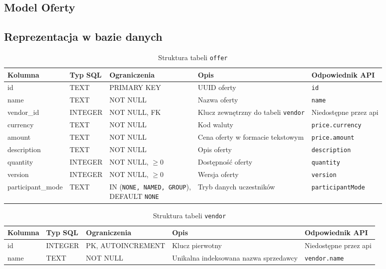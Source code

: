 \documentclass[11pt]{article}
\begin{document}
\subsection{Model Oferty}



\subsection{Reprezentacja w bazie danych}

\begin{table}[H]
  \centering
  \renewcommand{\arraystretch}{1.3} %
  \begin{tabularx}{\textwidth}{|l|l|l|X|l|}
    \hline
    \textbf{Kolumna} & \textbf{Typ SQL} & \textbf{Ograniczenia} & \textbf{Opis} & \textbf{Odpowiednik API} \\
    \hline
    id & TEXT & PRIMARY KEY & UUID oferty & \texttt{id} \\
    \hline
    name & TEXT & NOT NULL & Nazwa oferty & \texttt{name} \\
    \hline
    vendor\_id & INTEGER & NOT NULL, FK & Klucz zewnętrzny do tabeli \texttt{vendor} & Niedostępne przez api \\
    \hline
    currency & TEXT & NOT NULL & Kod waluty & \texttt{price.currency} \\
    \hline
    amount & TEXT & NOT NULL & Cena oferty w formacie tekstowym & \texttt{price.amount} \\
    \hline
    description & TEXT & NOT NULL & Opis oferty & \texttt{description} \\
    \hline
    quantity & INTEGER & NOT NULL, $\ge 0$ & Dostępność oferty & \texttt{quantity} \\
    \hline
    version & INTEGER & NOT NULL, $\ge 0$ & Wersja oferty & \texttt{version} \\
    \hline
    participant\_mode & TEXT & \makecell[tl]{IN (\texttt{NONE, NAMED, GROUP}), \\ DEFAULT \texttt{NONE}} & Tryb danych uczestników & \texttt{participantMode} \\
    \hline
  \end{tabularx}
  \caption{Struktura tabeli \texttt{offer}}
  \label{tab:schema-offer}
\end{table}

\begin{table}[H]
  \centering
  \renewcommand{\arraystretch}{1.3}
  \begin{tabularx}{\textwidth}{|l|l|l|X|l|}
    \hline
    \textbf{Kolumna} & \textbf{Typ SQL} & \textbf{Ograniczenia} & \textbf{Opis} & \textbf{Odpowiednik API} \\
    \hline
    id & INTEGER & PK, AUTOINCREMENT & Klucz pierwotny & Niedostępne przez api \\
    \hline
    name & TEXT & NOT NULL & Unikalna indeksowana nazwa sprzedawcy & \texttt{vendor.name} \\
    \hline
  \end{tabularx}
  \caption{Struktura tabeli \texttt{vendor}}
  \label{tab:schema-vendor}
\end{table}
\end{document}
